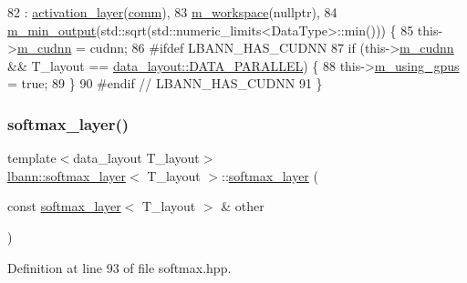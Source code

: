 \begin{DoxyCode}
82     : \hyperlink{classlbann_1_1activation__layer_a7df6f5d21ccdd5a24ad6233a52807c6d}{activation\_layer}(\hyperlink{file__io_8cpp_ab048c6f9fcbcfaa57ce68b00263dbebe}{comm}),
83       \hyperlink{classlbann_1_1softmax__layer_a604e614de25758f0072308c7efdd5bdb}{m\_workspace}(\textcolor{keyword}{nullptr}),
84       \hyperlink{classlbann_1_1softmax__layer_ab3bf2d92f4441923dd0b792c38ec774a}{m\_min\_output}(std::sqrt(std::numeric\_limits<DataType>::min())) \{
85     this->\hyperlink{classlbann_1_1Layer_a08dbb94239e3b8c96329786c57c72e21}{m\_cudnn} = cudnn;
86 \textcolor{preprocessor}{  #ifdef LBANN\_HAS\_CUDNN}
87     \textcolor{keywordflow}{if} (this->\hyperlink{classlbann_1_1Layer_a08dbb94239e3b8c96329786c57c72e21}{m\_cudnn} && T\_layout == \hyperlink{base_8hpp_a786677cbfb3f5677b4d84f3056eb08dba37d2a3465f7cbf4ab60f4e79944d0638}{data\_layout::DATA\_PARALLEL}) \{
88       this->\hyperlink{classlbann_1_1Layer_af7881cb5eff5207c15fa835d65462e8f}{m\_using\_gpus} = \textcolor{keyword}{true};
89     \}
90 \textcolor{preprocessor}{  #endif // LBANN\_HAS\_CUDNN}
91   \}
\end{DoxyCode}
\mbox{\label{classlbann_1_1softmax__layer_ad17b123fdc1c1d5fc57a1abe601de2b6}} 
\subsubsection{\texorpdfstring{softmax\+\_\+layer()}{softmax\_layer()}\hspace{0.1cm}{\footnotesize\ttfamily [2/2]}}
{\footnotesize\ttfamily template$<$data\+\_\+layout T\+\_\+layout$>$ \\
\hyperlink{classlbann_1_1softmax__layer}{lbann\+::softmax\+\_\+layer}$<$ T\+\_\+layout $>$\+::\hyperlink{classlbann_1_1softmax__layer}{softmax\+\_\+layer} (\begin{DoxyParamCaption}\item[{const \hyperlink{classlbann_1_1softmax__layer}{softmax\+\_\+layer}$<$ T\+\_\+layout $>$ \&}]{other }\end{DoxyParamCaption})\hspace{0.3cm}{\ttfamily [inline]}}



Definition at line 93 of file softmax.\+hpp.


